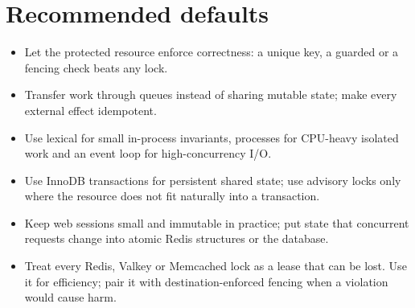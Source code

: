 \documentclass[11pt,openany]{book}
\makeatletter
\DeclareRobustCommand{\code}[1]{\texttt{\expandafter\code@quotes\expandafter{\detokenize{#1}}}}
\newcommand{\code@quotes}[1]{\saveexpandmode\expandarg
  \StrSubstitute{#1}{'}{\noexpand\textquotesingle}[\code@tmp]%
  \StrSubstitute{\code@tmp}{`}{\noexpand\textasciigrave}[\code@tmp]%
  \StrSubstitute{\code@tmp}{::}{::\noexpand\allowbreak}[\code@tmp]%
  \restoreexpandmode\code@tmp}
\makeatother
\begin{document}
\section*{Recommended defaults}
\begin{itemize}
\item Let the protected resource enforce correctness: a unique key, a guarded \code{UPDATE} or a fencing check beats any lock.
\item Transfer work through queues instead of sharing mutable state; make every external effect idempotent.
\item Use lexical \code{lock} for small in-process invariants, processes for CPU-heavy isolated work and an event loop for high-concurrency I/O.
\item Use InnoDB transactions for persistent shared state; use advisory locks only where the resource does not fit naturally into a transaction.
\item Keep web sessions small and immutable in practice; put state that concurrent requests change into atomic Redis structures or the database.
\item Treat every Redis, Valkey or Memcached lock as a lease that can be lost. Use it for efficiency; pair it with destination-enforced fencing when a violation would cause harm.
\end{itemize}
\end{document}
